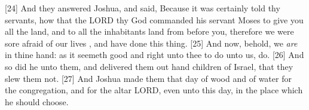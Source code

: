 [24] \textcolor[cmyk]{0.99998,1,0,0}{And they answered Joshua, and said, Because it was certainly told thy servants, how that the LORD thy God commanded his servant Moses to give you all the land, and to  all the inhabitants  land from before you, therefore we were sore afraid of our lives , and have done this thing.}
[25] \textcolor[cmyk]{0.99998,1,0,0}{And now, behold, we \emph{are} in thine hand: as it seemeth good and right unto thee to do unto us, do.}
[26] \textcolor[cmyk]{0.99998,1,0,0}{And so did he unto them, and delivered them out  hand  children of Israel, that they slew them not.}
[27] \textcolor[cmyk]{0.99998,1,0,0}{And Joshua made them that day  of wood and  of water for the congregation, and for the altar  LORD, even unto this day, in the place which he should choose.}

